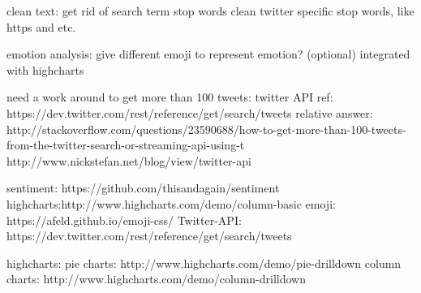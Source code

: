 clean text:
get rid of search term
stop words
clean twitter specific stop words, like https and etc.

emotion analysis:
give different emoji to represent emotion? (optional)
integrated with highcharts


need a work around to get more than 100 tweets:
twitter API ref: https://dev.twitter.com/rest/reference/get/search/tweets
relative answer: http://stackoverflow.com/questions/23590688/how-to-get-more-than-100-tweets-from-the-twitter-search-or-streaming-api-using-t
http://www.nickstefan.net/blog/view/twitter-api


sentiment: https://github.com/thisandagain/sentiment
highcharts:http://www.highcharts.com/demo/column-basic
emoji: https://afeld.github.io/emoji-css/
Twitter-API: https://dev.twitter.com/rest/reference/get/search/tweets

highcharts:
pie charts:  http://www.highcharts.com/demo/pie-drilldown
column charts: http://www.highcharts.com/demo/column-drilldown
